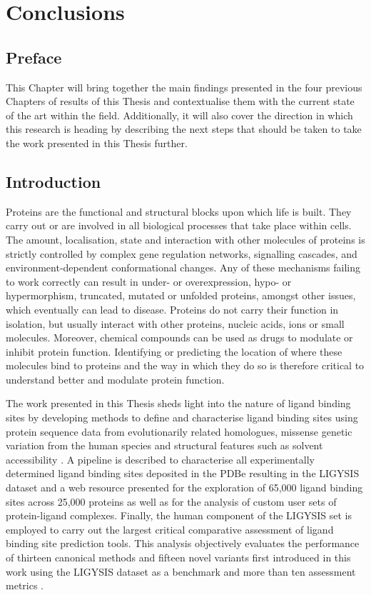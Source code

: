 \chapter{Conclusions}

\section*{Preface}

This Chapter will bring together the main findings presented in the four previous Chapters of results of this Thesis and contextualise them with the current state of the art within the field. Additionally, it will also cover the direction in which this research is heading by describing the next steps that should be taken to take the work presented in this Thesis further.

\section{Introduction}

Proteins are the functional and structural blocks upon which life is built. They carry out or are involved in all biological processes that take place within cells. The amount, localisation, state and interaction with other molecules of proteins is strictly controlled by complex gene regulation networks, signalling cascades, and environment-dependent conformational changes. Any of these mechanisms failing to work correctly can result in under- or overexpression, hypo- or hypermorphism, truncated, mutated or unfolded proteins, amongst other issues, which eventually can lead to disease. Proteins do not carry their function in isolation, but usually interact with other proteins, nucleic acids, ions or small molecules. Moreover, chemical compounds can be used as drugs to modulate or inhibit protein function. Identifying or predicting the location of where these molecules bind to proteins and the way in which they do so is therefore critical to understand better and modulate protein function.

The work presented in this Thesis sheds light into the nature of ligand binding sites by developing methods to define and characterise ligand binding sites using protein sequence data from evolutionarily related homologues, missense genetic variation from the human species and structural features such as solvent accessibility \cite{UTGES_2024_FRAGSYS}. A pipeline is described to characterise all experimentally determined ligand binding sites deposited in the PDBe \cite{ARMSTRONG_2020_PDBE} resulting in the LIGYSIS dataset and a web resource presented for the exploration of 65,000 ligand binding sites across 25,000 proteins as well as for the analysis of custom user sets of protein-ligand complexes. Finally, the human component of the LIGYSIS set is employed to carry out the largest critical comparative assessment of ligand binding site prediction tools. This analysis objectively evaluates the performance of thirteen canonical methods and fifteen novel variants first introduced in this work using the LIGYSIS dataset as a benchmark and more than ten assessment metrics \cite{UTGES_2024_LBSCOMP}.

